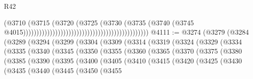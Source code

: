 \begin{lexlean}{R42}
\begin{coremodule}
{                                                                                  (@3710
                                                                                    (@3715
                                                                                      (@3720
                                                                                        (@3725
                                                                                          (@3730
                                                                                            (@3735
                                                                                              (@3740
                                                                                                (@3745
                                                                                                  @4015)))))))))))))))))))))))))))))))))))))))))))))))
@4111 := @3274
    (@3279
      (@3284
        (@3289
          (@3294
            (@3299
              (@3304
                (@3309
                  (@3314
                    (@3319
                      (@3324
                        (@3329
                          (@3334
                            (@3335
                              (@3340
                                (@3345
                                  (@3350
                                    (@3355
                                      (@3360
                                        (@3365
                                          (@3370
                                            (@3375
                                              (@3380
                                                (@3385
                                                  (@3390
                                                    (@3395
                                                      (@3400
                                                        (@3405
                                                          (@3410
                                                            (@3415
                                                              (@3420
                                                                (@3425
                                                                  (@3430
                                                                    (@3435
                                                                      (@3440
                                                                        (@3445
                                                                          (@3450
                                                                            (@3455
}
\end{coremodule}
\end{lexlean}
